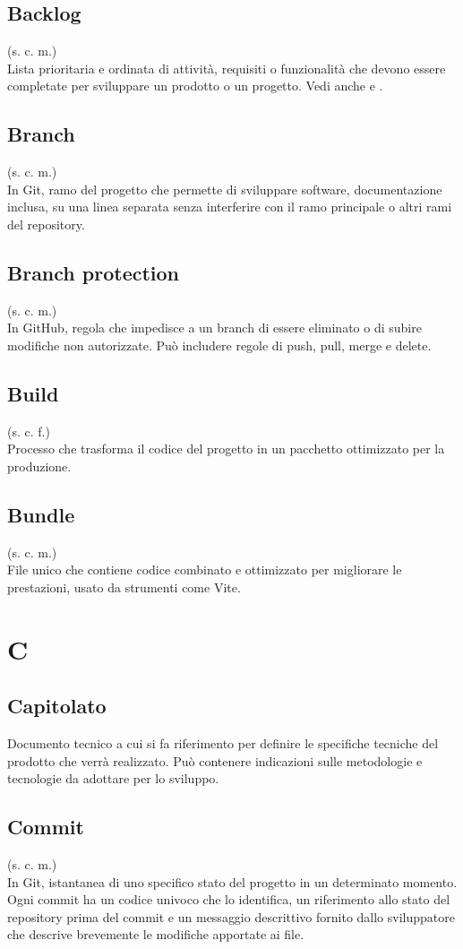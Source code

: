 \subsection{Backlog}
(s. c. m.)\\
Lista prioritaria e ordinata di attività, requisiti o funzionalità che devono
essere completate per sviluppare un prodotto o un progetto.
Vedi anche  e .
\subsection{Branch}
(s. c. m.)\\
In Git, ramo del progetto che permette di sviluppare software, documentazione inclusa, su una linea separata
senza interferire con il ramo principale o altri rami del repository.
\subsection{Branch protection}
\label{Branch protection}
(s. c. m.)\\
In GitHub, regola che impedisce a un branch di essere eliminato o di subire modifiche
non autorizzate. Può includere regole di push, pull, merge e delete.
\subsection{Build}
(s. c. f.)\\
Processo che trasforma il codice del progetto in un pacchetto ottimizzato per la produzione.
\subsection{Bundle}
(s. c. m.)\\
File unico che contiene codice combinato e ottimizzato per migliorare le prestazioni, usato da
strumenti come Vite.
\pagebreak
\section{C}
\subsection{Capitolato}
Documento tecnico a cui si fa riferimento per definire le specifiche tecniche
del prodotto che verrà realizzato. Può contenere indicazioni sulle metodologie
e tecnologie da adottare per lo sviluppo.
\subsection{Commit}
(s. c. m.)\\
In Git, istantanea di uno specifico stato del progetto in un determinato momento.
Ogni commit ha un codice univoco che lo identifica,
un riferimento allo stato del repository prima del commit e un messaggio descrittivo
fornito dallo sviluppatore che descrive brevemente le modifiche apportate ai file.

